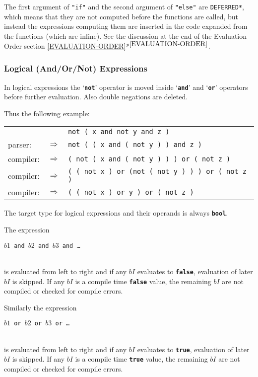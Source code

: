 \documentclass[12pt]{article}
\newcommand{\TT}[1]{{\tt \bfseries #1}}
\newcommand{\itemref}[1]{\ref{#1}$^{p\pageref{#1}}$}
\begin{document}
The first argument of {\tt "if"} and the second argument of {\tt "else"}
are {\tt *DEFERRED*}, which means that they are not computed before
the functions are called, but instead the expressions computing them
are inserted in the code expanded from the functions (which are
inline).  See the discussion at the end of the Evaluation Order section
\itemref{EVALUATION-ORDER}.

\subsubsection{Logical (And/Or/Not) Expressions}

In logical expressions the `\TT{not}' operator is moved inside
`\TT{and}' and `\TT{or}' operators before further evaluation.
Also double negations are deleted.

Thus the following example:
\begin{center}
\begin{tabular}{lcl}
	  &			& \tt not ( x and not y and z ) \\
parser:	  & $\Longrightarrow$ 	& \tt not ( ( x and ( not y ) ) and z ) \\
compiler: & $\Longrightarrow$ 	& \tt ( not ( x and ( not y ) ) ) or
                                                        ( not z ) \\
compiler: & $\Longrightarrow$ 	& \tt ( ( not x ) or (not ( not y ) ) ) or
                                                        ( not z ) \\
compiler: & $\Longrightarrow$ 	& \tt ( ( not x ) or y ) or ( not z ) \\
\end{tabular}
\end{center}

The target type for logical expressions and their operands
is always \TT{bool}.

The expression\\
\centerline{\tt $b1$ and $b2$ and $b3$ and \ldots{}}\\[1ex]
is evaluated from left to right and if any $bI$ evaluates to \TT{false},
evaluation of later $bI$ is skipped.
If any $bI$ is a
compile time \TT{false} value, the remaining $bI$ are not compiled
or checked for compile errors.

Similarly the expression\\
\centerline{\tt $b1$ or $b2$ or $b3$ or \ldots{}}\\[1ex]
is evaluated from left to right and if any $bI$ evaluates to \TT{true},
evaluation of later $bI$ is skipped.
If any $bI$ is a
compile time \TT{true} value, the remaining $bI$ are not compiled
or checked for compile errors.
\end{document}
